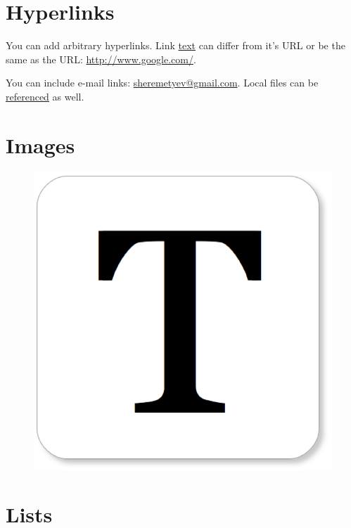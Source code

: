 \documentclass[10pt]{article}
\begin{document}
\section{Hyperlinks}

You can add arbitrary hyperlinks. Link \href{http://www.texts.io/}{text} can
differ from it's URL or be the same as the URL: \url{http://www.google.com/}.

You can include e-mail links: \url{sheremetyev@gmail.com}. Local files can be
\href{basic.pdf}{referenced} as well.

\section{Images}

\begin{figure}[H]
\centering
\includegraphics{Texts_Logo.png}
\end{figure}

\section{Lists}
\end{document}

